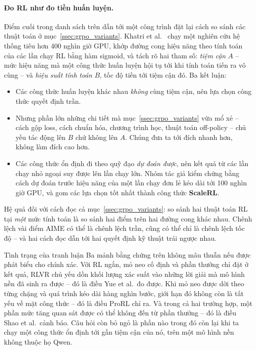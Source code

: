 \paragraph{Đo RL như đo tiền huấn luyện.}
Điểm cuối trong danh sách trên dẫn tới một công trình đặt lại cách so sánh các thuật toán ở mục~\ref{ssec:grpo_variants}. Khatri et al.~\cite{khatri2025scalerl} chạy một nghiên cứu hệ thống tiêu hơn 400 nghìn giờ GPU, khớp đường cong hiệu năng theo tính toán của các lần chạy RL bằng hàm sigmoid, và tách rõ hai tham số: \emph{tiệm cận} $A$ -- mức hiệu năng mà một công thức huấn luyện hội tụ tới khi tính toán tiến ra vô cùng -- và \emph{hiệu suất tính toán} $B$, tốc độ tiến tới tiệm cận đó. Ba kết luận:
\begin{itemize}
	\item Các công thức huấn luyện khác nhau \emph{không} cùng tiệm cận, nên lựa chọn công thức quyết định trần.
	\item Nhưng phần lớn những chi tiết mà mục~\ref{ssec:grpo_variants} vừa mổ xẻ -- cách gộp loss, cách chuẩn hóa, chương trình học, thuật toán off-policy -- chủ yếu tác động lên $B$ chứ không lên $A$. Chúng đưa ta tới đích nhanh hơn, không làm đích cao hơn.
	\item Các công thức ổn định đi theo quỹ đạo \emph{dự đoán được}, nên kết quả từ các lần chạy nhỏ ngoại suy được lên lần chạy lớn. Nhóm tác giả kiểm chứng bằng cách dự đoán trước hiệu năng của một lần chạy đơn lẻ kéo dài tới 100 nghìn giờ GPU, và gom các lựa chọn tốt nhất thành công thức \textbf{ScaleRL}.
\end{itemize}
Hệ quả đối với cách đọc cả mục~\ref{ssec:grpo_variants}: so sánh hai thuật toán RL tại \emph{một} mức tính toán là so sánh hai điểm trên hai đường cong khác nhau. Chênh lệch vài điểm AIME có thể là chênh lệch trần, cũng có thể chỉ là chênh lệch tốc độ -- và hai cách đọc dẫn tới hai quyết định kỹ thuật trái ngược nhau.

\begin{keyidea}{Tình trạng của tranh luận}
Ba mảnh bằng chứng trên không mâu thuẫn nếu được phát biểu cho chính xác. Với RL ngắn, mỏ neo cố định và phần thưởng chỉ đặt ở kết quả, RLVR chủ yếu dồn khối lượng xác suất vào những lời giải mà mô hình nền đã sinh ra được -- đó là điều Yue et al.\ đo được. Khi mỏ neo được dời theo từng chặng và quá trình kéo dài hàng nghìn bước, giới hạn đó không còn là tất yếu về mặt công thức -- đó là điều ProRL chỉ ra. Và trong cả hai trường hợp, một phần mức tăng quan sát được có thể không đến từ phần thưởng -- đó là điều Shao et al.\ cảnh báo. Câu hỏi còn bỏ ngỏ là phần nào trong đó còn lại khi ta chạy một công thức ổn định tới gần tiệm cận của nó, trên một mô hình nền không thuộc họ Qwen.
\end{keyidea}

